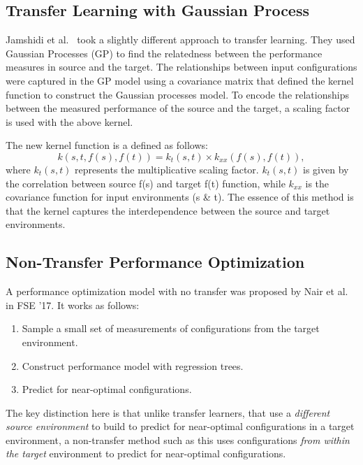 \documentclass[10pt,journal,compsoc]{IEEEtran}
\newcommand{\be}{\begin{enumerate}}
\newcommand{\ee}{\end{enumerate}}
\begin{document}
\vspace{-0.2cm}
\subsection{Transfer Learning with Gaussian Process} 


Jamshidi et al.~\cite{jamshidi2017transfer} took a slightly different approach to transfer learning. They used Gaussian Processes (GP) to find the relatedness between the performance measures in source and the target. The relationships between input configurations were
captured in the GP model using a covariance matrix that
defined the kernel function to construct the Gaussian processes model. To encode the relationships between the measured performance of the source and the target, a scaling factor is used with the above kernel. 

% 
% 


The new kernel function is a defined as follows:
\begin{equation}
    k(s, t, f(s), f(t)) = k_t(s, t) \times k_{xx}(f(s), f(t)),
\end{equation}\label{eq:gpkernel}
where $k_t(s,t)$ represents the multiplicative scaling factor. $k_t(s,t)$ is given by the correlation between source f(s) and target f(t) function, while $k_{xx}$ is the covariance function for input environments (s \& t). The essence of this method is that the kernel captures the interdependence  between the source and target environments. 
\vspace{-0.2cm}
\subsection{Non-Transfer Performance Optimization}
\label{sect:nair}
A performance optimization model with no transfer was proposed by Nair et al.~\cite{nair2017using} in FSE '17. It works as follows: 
\be[leftmargin=*]
\item Sample a small set of measurements of configurations from the target environment.
\item Construct performance model with regression trees. 
\item Predict for near-optimal configurations. 
\ee
The key distinction here is that unlike transfer learners, that use a \textit{different source environment} to build to predict for near-optimal configurations in a target environment, a non-transfer method such as this uses configurations \textit{from within the target} environment to predict for near-optimal configurations. 
\end{document}
